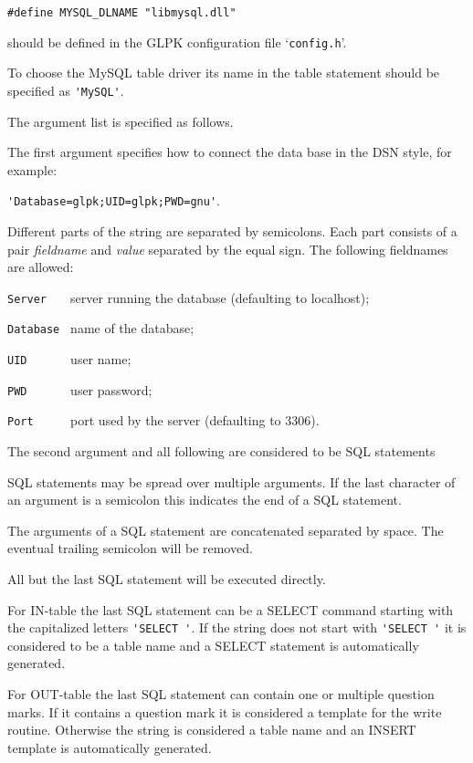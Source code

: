 \documentclass[11pt,draft]{article}
\begin{document}
\begin{verbatim}
#define MYSQL_DLNAME "libmysql.dll"
\end{verbatim}

\noindent
should be defined in the GLPK configuration file `\verb|config.h|'.

\bigskip

To choose the MySQL table driver its name in the table statement should
be specified as \verb|'MySQL'|.

The argument list is specified as follows.

The first argument specifies how to connect the data base in the DSN
style, for example:

\verb|'Database=glpk;UID=glpk;PWD=gnu'|.

Different parts of the string are separated by semicolons. Each part
consists of a pair {\it fieldname} and {\it value} separated by the
equal sign. The following fieldnames are allowed:

\verb|Server   | server running the database (defaulting to localhost);

\verb|Database | name of the database;

\verb|UID      | user name;

\verb|PWD      | user password;

\verb|Port     | port used by the server (defaulting to 3306).

The second argument and all following are considered to be SQL
statements

SQL statements may be spread over multiple arguments.  If the last
character of an argument is a semicolon this indicates the end of
a SQL statement.

The arguments of a SQL statement are concatenated separated by space.
The eventual trailing semicolon will be removed.

All but the last SQL statement will be executed directly.

For IN-table the last SQL statement can be a SELECT command starting
with the capitalized letters \verb|'SELECT '|. If the string does not
start with \verb|'SELECT '| it is considered to be a table name and a
SELECT statement is automatically generated.

For OUT-table the last SQL statement can contain one or multiple
question marks. If it contains a question mark it is considered a
template for the write routine. Otherwise the string is considered a
table name and an INSERT template is automatically generated.
\end{document}
